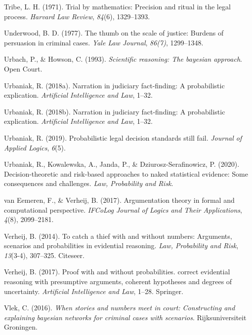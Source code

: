 \documentclass[11pt,dvipsnames,enabledeprecatedfontcommands]{scrartcl}
\begin{document}
\hypertarget{ref-tribe71}{}
Tribe, L. H. (1971). Trial by mathematics: Precision and ritual in the
legal process. \emph{Harvard Law Review}, \emph{84}(6), 1329--1393.

\hypertarget{ref-Underwood1977The-thumb-on-th}{}
Underwood, B. D. (1977). The thumb on the scale of justice: Burdens of
persuasion in criminal cases. \emph{Yale Law Journal}, \emph{86(7)},
1299--1348.

\hypertarget{ref-Urbach1993-HOWSRT}{}
Urbach, P., \& Howson, C. (1993). \emph{Scientific reasoning: The
bayesian approach}. Open Court.

\hypertarget{ref-urbaniak2018narration}{}
Urbaniak, R. (2018a). Narration in judiciary fact-finding: A
probabilistic explication. \emph{Artificial Intelligence and Law},
1--32.

\hypertarget{ref-Urbaniak2017Narration-in-ju}{}
Urbaniak, R. (2018b). Narration in judiciary fact-finding: A
probabilistic explication. \emph{Artificial Intelligence and Law},
1--32.

\hypertarget{ref-Urbaniak2019standards2}{}
Urbaniak, R. (2019). Probabilistic legal decision standards still fail.
\emph{Journal of Applied Logics}, \emph{6}(5).

\hypertarget{ref-Urbaniak2020Decision}{}
Urbaniak, R., Kowalewska, A., Janda, P., \& Dziurosz-Serafinowicz, P.
(2020). Decision-theoretic and risk-based approaches to naked
statistical evidence: Some consequences and challenges. \emph{Law,
Probability and Risk}.

\hypertarget{ref-vanEemeren2017}{}
van Eemeren, F., \& Verheij, B. (2017). Argumentation theory in formal
and computational perspective. \emph{IFCoLog Journal of Logics and Their
Applications}, \emph{4}(8), 2099--2181.

\hypertarget{ref-verheij2014catch}{}
Verheij, B. (2014). To catch a thief with and without numbers:
Arguments, scenarios and probabilities in evidential reasoning.
\emph{Law, Probability and Risk}, \emph{13}(3-4), 307--325. Citeseer.

\hypertarget{ref-verheijproof2017}{}
Verheij, B. (2017). Proof with and without probabilities. correct
evidential reasoning with presumptive arguments, coherent hypotheses and
degrees of uncertainty. \emph{Artificial Intelligence and Law}, 1--28.
Springer.

\hypertarget{ref-vlek2016stories}{}
Vlek, C. (2016). \emph{When stories and numbers meet in court:
Constructing and explaining bayesian networks for criminal cases with
scenarios}. Rijksuniversiteit Groningen.
\end{document}
